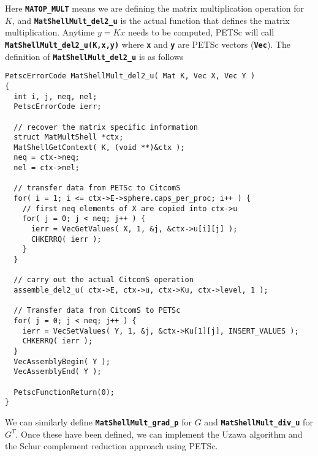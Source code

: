 \documentclass[10pt,letterpaper]{article}
\newcommand{\code}[1]{\textbf{\texttt{#1}}}
\begin{document}
Here \code{MATOP\_MULT} means we are defining the matrix multiplication 
operation for $K$, and \code{MatShellMult\_del2\_u} is the actual function that 
defines the matrix multiplication. Anytime $y=Kx$ needs to be computed, PETSc
will call \code{MatShellMult\_del2\_u(K,x,y)} where \code{x} and \code{y} are 
PETSc vectors (\code{Vec}). The definition of \code{MatShellMult\_del2\_u} 
is as follows
\begin{lstlisting}[frame=tb,mathescape,caption=MatShellMult\_del2\_u]
PetscErrorCode MatShellMult_del2_u( Mat K, Vec X, Vec Y )
{
  int i, j, neq, nel;
  PetscErrorCode ierr;
  
  // recover the matrix specific information
  struct MatMultShell *ctx;
  MatShellGetContext( K, (void **)&ctx );
  neq = ctx->neq;
  nel = ctx->nel;
  
  // transfer data from PETSc to CitcomS
  for( i = 1; i <= ctx->E->sphere.caps_per_proc; i++ ) {
    // first neq elements of X are copied into ctx->u
    for( j = 0; j < neq; j++ ) {
      ierr = VecGetValues( X, 1, &j, &ctx->u[i][j] );
      CHKERRQ( ierr );
    }
  }

  // carry out the actual CitcomS operation
  assemble_del2_u( ctx->E, ctx->u, ctx->Ku, ctx->level, 1 );

  // Transfer data from CitcomS to PETSc
  for( j = 0; j < neq; j++ ) {
    ierr = VecSetValues( Y, 1, &j, &ctx->Ku[1][j], INSERT_VALUES );
    CHKERRQ( ierr );
  }
  VecAssemblyBegin( Y );
  VecAssemblyEnd( Y );
  
  PetscFunctionReturn(0);
}
\end{lstlisting}
We can similarly define \code{MatShellMult\_grad\_p} for $G$ and
\code{MatShellMult\_div\_u} for $G^T$. Once these have been defined, we can
implement the Uzawa algorithm and the Schur complement reduction approach using
PETSc.

\end{document}
